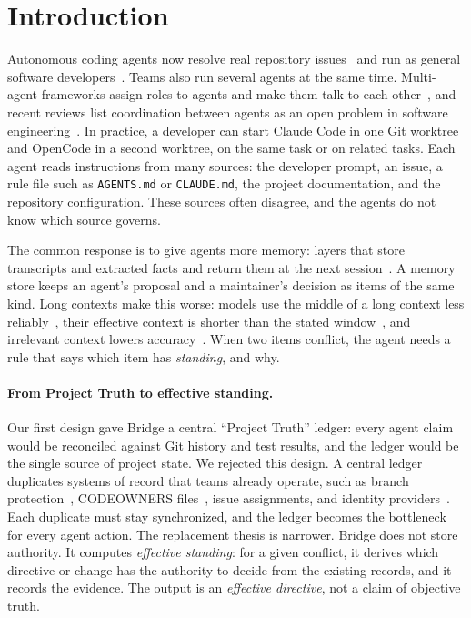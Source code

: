 \section{Introduction}
\label{sec:intro}

Autonomous coding agents now resolve real repository issues~\cite{jimenez2024swebench,yang2024sweagent,zhang2024autocoderover,xia2024agentless} and run as general software developers~\cite{wang2025openhands}. Teams also run several agents at the same time. Multi-agent frameworks assign roles to agents and make them talk to each other~\cite{qian2024chatdev,hong2023metagpt,wu2023autogen}, and recent reviews list coordination between agents as an open problem in software engineering~\cite{he2025llmmas,hou2024llm4se}. In practice, a developer can start Claude Code in one Git worktree and OpenCode in a second worktree, on the same task or on related tasks. Each agent reads instructions from many sources: the developer prompt, an issue, a rule file such as \texttt{AGENTS.md} or \texttt{CLAUDE.md}, the project documentation, and the repository configuration. These sources often disagree, and the agents do not know which source governs.

The common response is to give agents more memory: layers that store transcripts and extracted facts and return them at the next session~\cite{packer2023memgpt,chhikara2025mem0,rasmussen2025zep,honcho2026}. A memory store keeps an agent's proposal and a maintainer's decision as items of the same kind. Long contexts make this worse: models use the middle of a long context less reliably~\cite{liu2024lost}, their effective context is shorter than the stated window~\cite{hsieh2024ruler}, and irrelevant context lowers accuracy~\cite{shi2023distracted}. When two items conflict, the agent needs a rule that says which item has \emph{standing}, and why.

\paragraph{From Project Truth to effective standing.}
Our first design gave Bridge a central ``Project Truth'' ledger: every agent claim would be reconciled against Git history and test results, and the ledger would be the single source of project state. We rejected this design. A central ledger duplicates systems of record that teams already operate, such as branch protection~\cite{githubbranchprotection}, CODEOWNERS files~\cite{githubcodeowners}, issue assignments, and identity providers~\cite{rfc6749,spiffe2026}. Each duplicate must stay synchronized, and the ledger becomes the bottleneck for every agent action. The replacement thesis is narrower. Bridge does not store authority. It computes \emph{effective standing}: for a given conflict, it derives which directive or change has the authority to decide from the existing records, and it records the evidence. The output is an \emph{effective directive}, not a claim of objective truth.

